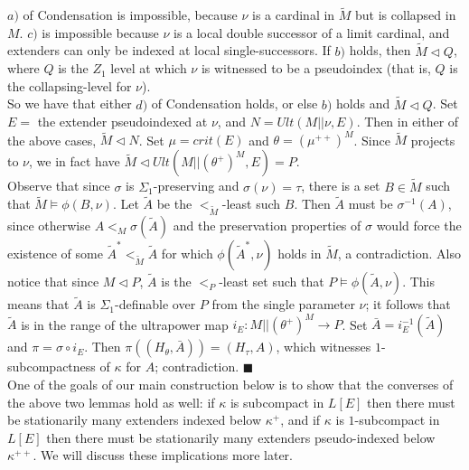 \documentclass[12pt]{article}
\begin{document}
$a)$ of Condensation is impossible, because $\nu$ is a cardinal in $\tilde{M}$ but is collapsed in $M$.  $c)$ is impossible because $\nu$ is a local double successor of a limit cardinal, and extenders can only be indexed at local single-successors.  If $b)$ holds, then $\tilde{M} \lhd Q$, where $Q$ is the $Z_1$ level at which $\nu$ is witnessed to be a pseudoindex (that is, $Q$ is the collapsing-level for $\nu$).\\

So we have that either $d)$ of Condensation holds, or else $b)$ holds and $\tilde{M} \lhd Q$.  Set $E =$ the extender pseudoindexed at $\nu$, and $N = Ult (M || \nu , E )$.  Then in either of the above cases, $\tilde{M} \lhd N$.  Set $\mu = crit( E )$ and $\theta = ( \mu^{++} )^M$.  Since $\tilde{M}$ projects to $\nu$, we in fact have $\tilde{M} \lhd Ult ( M || ( \theta^+ )^M , E) = P$.\\

Observe that since $\sigma$ is $\Sigma_1$-preserving and $\sigma (\nu) = \tau$, there is a set $B \in \tilde{M}$ such that $\tilde{M} \models \phi (B , \nu )$.  Let $\tilde{A}$ be the $<_{\tilde{M}}$-least such $B$.  Then $\tilde{A}$ must be $\sigma^{-1} (A)$, since otherwise $A <_M \sigma (\tilde{A} )$ and the preservation properties of $\sigma$ would force the existence of some $\tilde{A}^*  <_{\tilde{M}} \tilde{A}$ for which $\phi ( \tilde{A}^* , \nu )$ holds in $\tilde{M}$, a contradiction.  Also notice that since $M \lhd P$, $\tilde{A}$ is the $<_P$-least set such that $P \models \phi(\tilde{A} , \nu )$.  This means that $\tilde{A}$ is $\Sigma_1$-definable over $P$ from the single parameter $\nu$; it follows that $\tilde{A}$ is in the range of the ultrapower map $i_{E } : M || (\theta^+ )^M \longrightarrow P$.  Set $\bar{A} = i_{E}^{-1} (\tilde{A} )$ and $\pi = \sigma \circ i_{E}$.  Then $\pi (( H_\theta , \bar{A} )) = (H_\tau , A )$, which witnesses $1$-subcompactness of $\kappa$ for $A$; contradiction. $\blacksquare$\\



One of the goals of our main construction below is to show that the converses of the above two lemmas hold as well: if $\kappa$ is subcompact in $L[E]$ then there must be stationarily many extenders indexed below $\kappa^+$, and if $\kappa$ is $1$-subcompact in $L[E]$ then there must be stationarily many extenders pseudo-indexed below $\kappa^{++}$.  We will discuss these implications more later.\\
\end{document}
